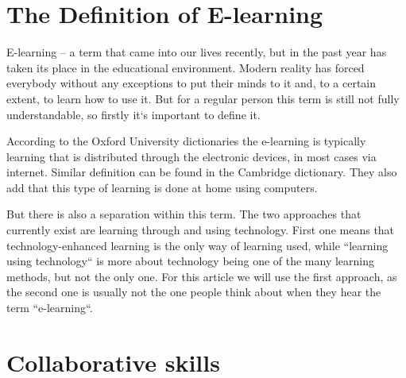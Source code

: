 \documentclass[10pt,oneside,english,a4paper]{article}
\begin{document}
\section{The Definition of E-learning} \label{definition}

E-learning – a term that came into our lives recently, but in the past year has taken its place in the educational environment. Modern reality has forced everybody without any exceptions to put their minds to it and, to a certain extent, to learn how to use it. But for a regular person this term is still not fully understandable, so firstly it`s important to define it.\par
According to the Oxford University dictionaries the e-learning is typically learning that is distributed through the electronic devices, in most cases via internet. Similar definition can be found in the Cambridge dictionary. They also add that this type of learning is done at home using computers.\par
But there is also a separation within this term. The two approaches that currently exist are learning through and using technology. First one means that technology-enhanced learning is the only way of learning used, while ``learning using technology`` is more about technology being one of the many learning methods, but not the only one. For this article we will use the first approach, as the second one is usually not the one people think about when they hear the term ``e-learning``.

\section{Collaborative skills} \label{collab}
\end{document}
